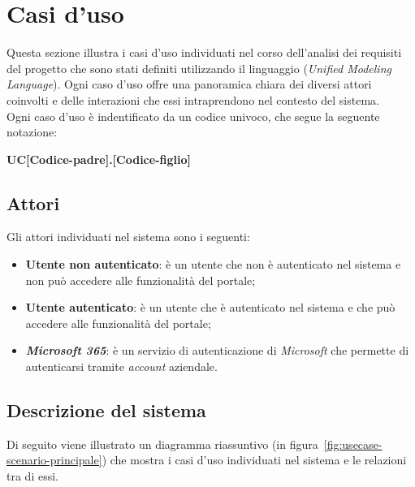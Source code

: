 \section{Casi d'uso}\label{sec:usecase}
Questa sezione illustra i casi d'uso individuati nel corso dell'analisi dei requisiti del progetto che sono stati definiti utilizzando il linguaggio  (\textit{Unified Modeling Language}).
Ogni caso d'uso offre una panoramica chiara dei diversi attori coinvolti e delle interazioni che essi intraprendono nel contesto del sistema.\\
Ogni caso d'uso è indentificato da un codice univoco, che segue la seguente notazione:

\begin{center}
    \textbf{UC[Codice-padre].[Codice-figlio]}
  \end{center}

\subsection{Attori}\label{subsec:attori}
Gli attori individuati nel sistema sono i seguenti:
\begin{itemize}
    \item \textbf{Utente non autenticato}: è un utente che non è autenticato nel sistema e non può accedere alle funzionalità del portale;
    \item \textbf{Utente autenticato}: è un utente che è autenticato nel sistema e che può accedere alle funzionalità del portale;
    \item \textbf{\textit{Microsoft 365}}: è un servizio di autenticazione di \textit{Microsoft} che permette di autenticarsi tramite \textit{\textit{account}} aziendale.

\end{itemize}

\clearpage

\subsection{Descrizione del sistema}\label{subsec:descrizione-sistema}

Di seguito viene illustrato un diagramma riassuntivo (in figura~\ref{fig:usecase-scenario-principale}) che mostra i casi d'uso individuati nel sistema e le relazioni tra di essi.


